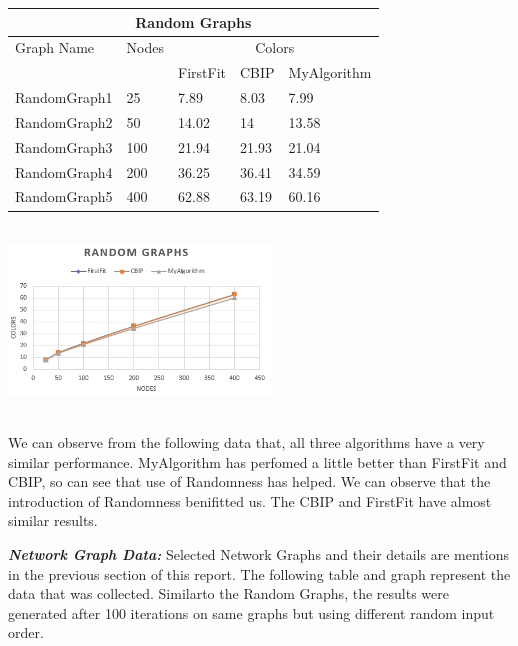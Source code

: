 \documentclass{article}
\begin{document}
	\begin{minipage}{0.5\linewidth}
		 \begin{tabular}{||p{2.5cm} | p{0.8cm} | p{1.5cm} | p{1.5cm} | p{1.9cm} ||} 
			\hline
			\multicolumn{5}{|c|}{Random Graphs} \\
			\hline
			\hline
			Graph Name& Nodes & \multicolumn{3}{|c|}{Colors} \\
			\hline
			 & & FirstFit & CBIP & MyAlgorithm \\ [0.5ex] 
			 \hline\hline
			RandomGraph1 & 25 & 7.89 & 8.03 & 7.99 \\ 
			 \hline
			RandomGraph2 & 50 & 14.02 & 14 & 13.58\\
			 \hline
			RandomGraph3 & 100 & 21.94 & 21.93 & 21.04 \\
			 \hline
			RandomGraph4 & 200 & 36.25 & 36.41 & 34.59 \\
			 \hline
			RandomGraph5 & 400 & 62.88 & 63.19 & 60.16\\ [1ex] 
			 \hline
		\end{tabular}
	\end{minipage}\hfill
	\begin{minipage}{5cm}
		\centering
		\includegraphics[height=5cm,width=7cm]{RandomGraph}
	\end{minipage}
\bigbreak
We can observe from the following data that, all three algorithms have a very similar performance. MyAlgorithm has perfomed a little better than
FirstFit and CBIP, so can see that use of Randomness has helped. We can observe that the introduction of Randomness benifitted us. 
The CBIP and FirstFit have almost similar results. \\

\bigbreak

\textbf{\textit{Network Graph Data:}}
Selected Network Graphs and their details are mentions in the previous section of this report. The following table and graph represent the data 
that was collected. Similarto the Random Graphs, the results were generated after 100 iterations on same graphs but using different random 
input order.\\
\end{document}
